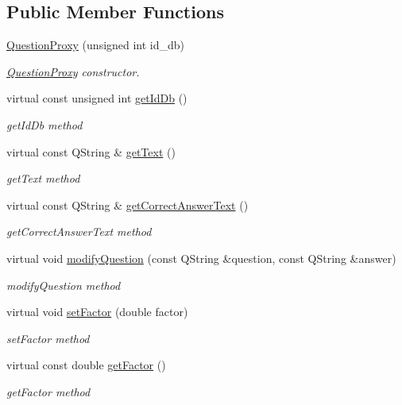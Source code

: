 \subsection*{Public Member Functions}
\begin{DoxyCompactItemize}
\item 
\hyperlink{class_question_proxy_a68b0fb83effeb190d956bcc898ced585}{Question\+Proxy} (unsigned int id\+\_\+db)
\begin{DoxyCompactList}\small\item\em \hyperlink{class_question_proxy}{Question\+Proxy} constructor. \end{DoxyCompactList}\item 
virtual const unsigned int \hyperlink{class_question_proxy_a720f1ae28f66770e40859fd19945450c}{get\+Id\+Db} ()
\begin{DoxyCompactList}\small\item\em get\+Id\+Db method \end{DoxyCompactList}\item 
virtual const Q\+String \& \hyperlink{class_question_proxy_ac5fc3eeef47b1955b116599cb860aa4e}{get\+Text} ()
\begin{DoxyCompactList}\small\item\em get\+Text method \end{DoxyCompactList}\item 
virtual const Q\+String \& \hyperlink{class_question_proxy_aaea03e52cf7e3f9d19d59134e88d6df0}{get\+Correct\+Answer\+Text} ()
\begin{DoxyCompactList}\small\item\em get\+Correct\+Answer\+Text method \end{DoxyCompactList}\item 
virtual void \hyperlink{class_question_proxy_a420fb6fae2d691aa0c574939b815a205}{modify\+Question} (const Q\+String \&question, const Q\+String \&answer)
\begin{DoxyCompactList}\small\item\em modify\+Question method \end{DoxyCompactList}\item 
virtual void \hyperlink{class_question_proxy_a6993b6a84ebaf916fce21f41b0401fe7}{set\+Factor} (double factor)
\begin{DoxyCompactList}\small\item\em set\+Factor method \end{DoxyCompactList}\item 
virtual const double \hyperlink{class_question_proxy_af3eeb645cbd04fe05418e5931e55585e}{get\+Factor} ()
\begin{DoxyCompactList}\small\item\em get\+Factor method \end{DoxyCompactList}\end{DoxyCompactItemize}


